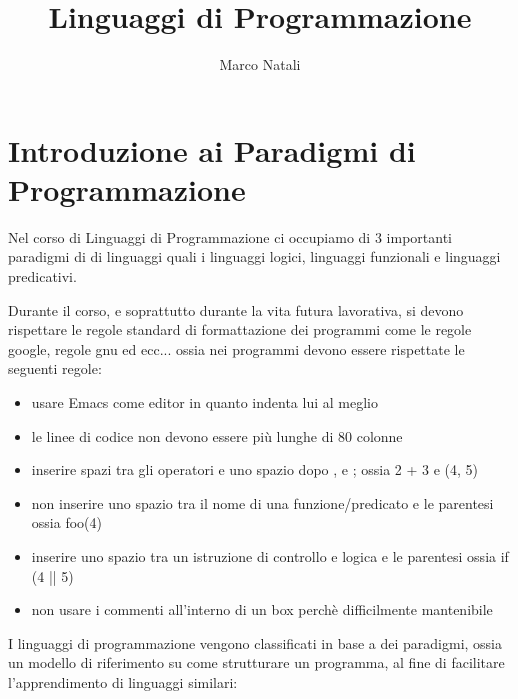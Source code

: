 \documentclass[a4paper]{report}
\begin{document}
\title{Linguaggi di Programmazione}
\author{Marco Natali}
\date{}%
\maketitle

\tableofcontents

\chapter{Introduzione ai Paradigmi di Programmazione}
Nel corso di Linguaggi di Programmazione ci occupiamo di 3 importanti paradigmi di 
di linguaggi quali i linguaggi logici, linguaggi funzionali e linguaggi predicativi.

Durante il corso, e soprattutto durante la vita futura lavorativa, si devono rispettare le regole
standard di formattazione dei programmi come le regole google, regole gnu ed ecc... ossia nei programmi
devono essere rispettate le seguenti regole:
\begin{itemize}
\item usare Emacs come editor in quanto indenta lui al meglio
\item le linee di codice non devono essere più lunghe di 80 colonne
\item inserire spazi tra gli operatori e uno spazio dopo , e ; ossia 2 + 3 e (4, 5)
\item non inserire uno spazio tra il nome di una funzione/predicato e le parentesi ossia foo(4)
\item inserire uno spazio tra un istruzione di controllo e logica  e le parentesi ossia if (4 || 5)
\item non usare i commenti all'interno di un box perchè difficilmente mantenibile
\end{itemize}
I linguaggi di programmazione vengono classificati in base a dei paradigmi, ossia un modello di riferimento
su come strutturare un programma, al fine di facilitare l'apprendimento di linguaggi similari:
\end{document}
